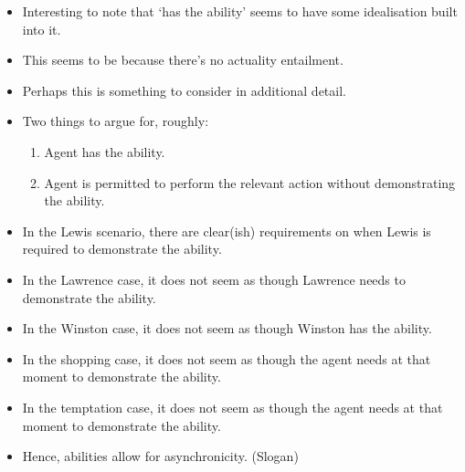 \documentclass[10pt]{article}
\begin{document}
\begin{itemize}
\item Interesting to note that `has the ability' seems to have some idealisation built into it.
\item This seems to be because there's no actuality entailment.
\item Perhaps this is something to consider in additional detail.
\end{itemize}

\begin{itemize}
\item Two things to argue for, roughly:
  \begin{enumerate}
  \item Agent has the ability.
  \item Agent is permitted to perform the relevant action without demonstrating the ability.
  \end{enumerate}
\item In the Lewis scenario, there are clear(ish) requirements on when Lewis is required to demonstrate the ability.
\item In the Lawrence case, it does not seem as though Lawrence needs to demonstrate the ability.
\item In the Winston case, it does not seem as though Winston has the ability.
\item In the shopping case, it does not seem as though the agent needs at that moment to demonstrate the ability.
\item In the temptation case, it does not seem as though the agent needs at that moment to demonstrate the ability.
\item Hence, abilities allow for asynchronicity. (Slogan)
\end{itemize}

\newpage

\printbibliography
\end{document}
